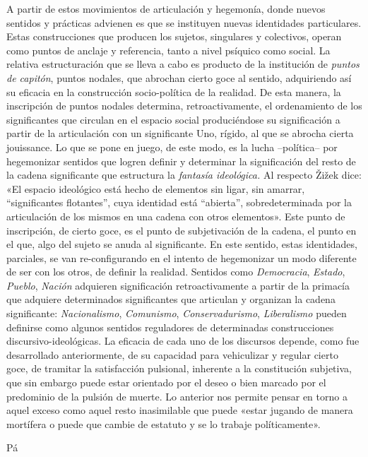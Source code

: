 A partir de estos movimientos de articulación y hegemonía, donde nuevos sentidos y prácticas advienen es que se instituyen nuevas identidades particulares. Estas construcciones que producen los sujetos, singulares y colectivos, operan como puntos de anclaje y referencia, tanto a nivel psíquico como social. La relativa estructuración que se lleva a cabo es producto de la institución de \emph{puntos de capitón}, puntos nodales, que abrochan cierto goce al sentido, adquiriendo así su eficacia en la construcción socio-política de la realidad. De esta manera, la inscripción de puntos nodales determina, retroactivamente, el ordenamiento de los significantes que circulan en el espacio social produciéndose su significación a partir de la articulación con un significante Uno, rígido, al que se abrocha cierta jouissance. Lo que se pone en juego, de este modo, es la lucha --política-- por hegemonizar sentidos que logren definir y determinar la significación del resto de la cadena significante que estructura la \emph{fantasía ideológica.} Al respecto Žižek dice: «El espacio ideológico está hecho de elementos sin ligar, sin amarrar, ``significantes flotantes'', cuya identidad está ``abierta'', sobredeterminada por la articulación de los mismos en una cadena con otros elementos». Este punto de inscripción, de cierto goce, es el punto de subjetivación de la cadena, el punto en el que, algo del sujeto se anuda al significante. En este sentido, estas identidades, parciales, se van re-configurando en el intento de hegemonizar un modo diferente de ser con los otros, de definir la realidad. Sentidos como \emph{Democracia}, \emph{Estado}, \emph{Pueblo}, \emph{Nación} adquieren significación retroactivamente a partir de la primacía que adquiere determinados significantes que articulan y organizan la cadena significante: \emph{Nacionalismo}, \emph{Comunismo}, \emph{Conservadurismo}, \emph{Liberalismo }pueden definirse como algunos sentidos reguladores de determinadas construcciones discursivo-ideológicas. La eficacia de cada uno de los discursos depende, como fue desarrollado anteriormente, de su capacidad para vehiculizar y regular cierto goce, de tramitar la satisfacción pulsional, inherente a la constitución subjetiva, que sin embargo puede estar orientado por el deseo o bien marcado por el predominio de la pulsión de muerte. Lo anterior nos permite pensar en torno a aquel exceso como aquel resto inasimilable que puede «estar jugando de manera mortífera o puede que cambie de estatuto y se lo trabaje políticamente».

Pá

